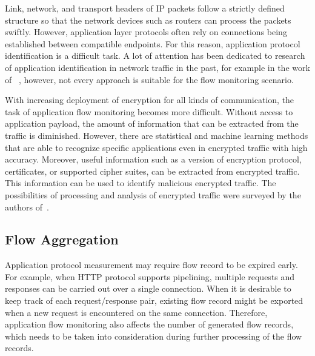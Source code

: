 Link, network, and transport headers of IP packets follow a strictly defined structure so that the network devices such as routers can process the packets swiftly. However, application layer protocols often rely on connections being established between compatible endpoints. For this reason, application protocol identification is a difficult task. A lot of attention has been dedicated to research of application identification in network traffic in the past, for example in the work of \citeauthor{Bujlow-2015-classification}~\cite{Bujlow-2015-classification}, however, not every approach is suitable for the flow monitoring scenario.

With increasing deployment of encryption for all kinds of communication, the task of application flow monitoring becomes more difficult. Without access to application payload, the amount of information that can be extracted from the traffic is diminished. However, there are statistical and machine learning methods that are able to recognize specific applications even in encrypted traffic with high accuracy. Moreover, useful information such as a version of encryption protocol, certificates, or supported cipher suites, can be extracted from encrypted traffic. This information can be used to identify malicious encrypted traffic. The possibilities of processing and analysis of encrypted traffic were surveyed by the authors of~\cite{Velan-2015-Survey}.

\subsection{Flow Aggregation}

Application protocol measurement may require flow record to be expired early. For example, when HTTP protocol supports pipelining, multiple requests and responses can be carried out over a single connection. When it is desirable to keep track of each request/response pair, existing flow record might be exported when a new request is encountered on the same connection. Therefore, application flow monitoring  also affects the number of generated flow records, which needs to be taken into consideration during further processing of the flow records.


